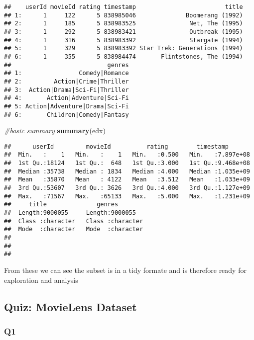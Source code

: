 \documentclass[
]{article}
\newenvironment{Shaded}{\begin{snugshade}}{\end{snugshade}}
\newcommand{\CommentTok}[1]{\textcolor[rgb]{0.56,0.35,0.01}{\textit{#1}}}
\newcommand{\KeywordTok}[1]{\textcolor[rgb]{0.13,0.29,0.53}{\textbf{#1}}}
\newcommand{\NormalTok}[1]{#1}
\begin{document}
\begin{verbatim}
##    userId movieId rating timestamp                         title
## 1:      1     122      5 838985046              Boomerang (1992)
## 2:      1     185      5 838983525               Net, The (1995)
## 3:      1     292      5 838983421               Outbreak (1995)
## 4:      1     316      5 838983392               Stargate (1994)
## 5:      1     329      5 838983392 Star Trek: Generations (1994)
## 6:      1     355      5 838984474       Flintstones, The (1994)
##                           genres
## 1:                Comedy|Romance
## 2:         Action|Crime|Thriller
## 3:  Action|Drama|Sci-Fi|Thriller
## 4:       Action|Adventure|Sci-Fi
## 5: Action|Adventure|Drama|Sci-Fi
## 6:       Children|Comedy|Fantasy
\end{verbatim}

\begin{Shaded}
\begin{Highlighting}[]
\CommentTok{#basic summary }
\KeywordTok{summary}\NormalTok{(edx)}
\end{Highlighting}
\end{Shaded}

\begin{verbatim}
##      userId         movieId          rating        timestamp        
##  Min.   :    1   Min.   :    1   Min.   :0.500   Min.   :7.897e+08  
##  1st Qu.:18124   1st Qu.:  648   1st Qu.:3.000   1st Qu.:9.468e+08  
##  Median :35738   Median : 1834   Median :4.000   Median :1.035e+09  
##  Mean   :35870   Mean   : 4122   Mean   :3.512   Mean   :1.033e+09  
##  3rd Qu.:53607   3rd Qu.: 3626   3rd Qu.:4.000   3rd Qu.:1.127e+09  
##  Max.   :71567   Max.   :65133   Max.   :5.000   Max.   :1.231e+09  
##     title              genres         
##  Length:9000055     Length:9000055    
##  Class :character   Class :character  
##  Mode  :character   Mode  :character  
##                                       
##                                       
## 
\end{verbatim}

From these we can see the subset is in a tidy formate and is therefore
ready for exploration and analysis

\hypertarget{quiz-movielens-dataset}{%
\subsection{Quiz: MovieLens Dataset}\label{quiz-movielens-dataset}}

\hypertarget{q1}{%
\subsubsection{Q1}\label{q1}}
\end{document}
